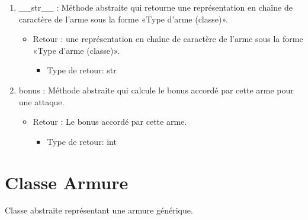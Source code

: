 \documentclass[12pt,pdftex,oneside]{article}
\begin{document}
\begin{itemize}
    \begin{enumerate}
    \item \_\_str\_\_ : Méthode abstraite qui retourne une représentation en chaîne de caractère de l'arme
      sous la forme «Type d'arme (classe)».
      \begin{itemize}
      \item Retour :  une représentation en chaîne de caractère de l'arme
      sous la forme «Type d'arme (classe)».
          \begin{itemize}
          \item Type de retour: str
          \end{itemize}
      \end{itemize}
    \item bonus : Méthode abstraite qui calcule le bonus accordé par cette arme
      pour une attaque.
      \begin{itemize}
      \item Retour : Le bonus accordé par cette arme.
          \begin{itemize}
          \item Type de retour: int
          \end{itemize}
      \end{itemize}
    \end{enumerate}

  \end{itemize}

  \section {Classe Armure}

  Classe abstraite représentant une armure générique.
\end{document}
